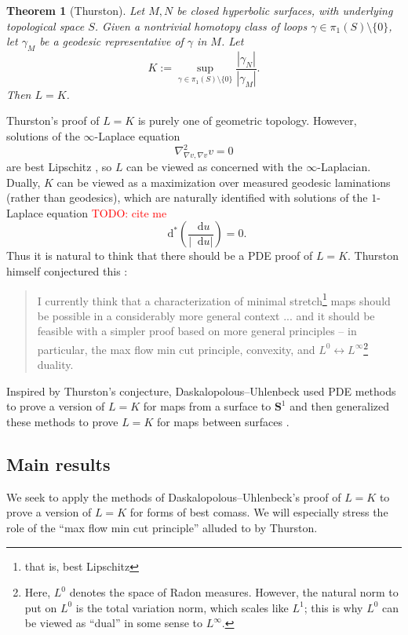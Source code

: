 \documentclass[reqno,11pt]{amsart}
\newcommand{\Sph}{\mathbf S}
\newcommand*\dif{\mathop{}\!\mathrm{d}}
\newtheorem{theorem}{Theorem}[section]
\theoremstyle{definition}
\numberwithin{equation}{section}
\newcommand\todo[1]{\textcolor{red}{TODO: #1}}
\begin{document}
\begin{theorem}[Thurston]
Let $M, N$ be closed hyperbolic surfaces, with underlying topological space $S$.
Given a nontrivial homotopy class of loops $\gamma \in \pi_1(S) \setminus \{0\}$, let $\gamma_M$ be a geodesic representative of $\gamma$ in $M$.
Let
$$K := \sup_{\gamma \in \pi_1(S) \setminus \{0\}} \frac{|\gamma_N|}{|\gamma_M|}.$$
Then $L = K$.
\end{theorem}

Thurston's proof of $L = K$ is purely one of geometric topology.
However, solutions of the $\infty$-Laplace equation 
$$\nabla^2_{\nabla v, \nabla v} v = 0$$
are best Lipschitz \cite{Crandall2008}, so $L$ can be viewed as concerned with the $\infty$-Laplacian.
Dually, $K$ can be viewed as a maximization over measured geodesic laminations (rather than geodesics), which are naturally identified with solutions of the $1$-Laplace equation \todo{cite me}
$$\dif^* \left(\frac{\dif u}{|\dif u|}\right) = 0.$$
Thus it is natural to think that there should be a PDE proof of $L = K$.
Thurston himself conjectured this \cite[Abstract]{Thurston98}:

\begin{quote}
I currently think that a characterization of minimal stretch\footnote{that is, best Lipschitz} maps should be possible in a considerably more general context ... and it should be feasible with a simpler proof based on more general principles -- in particular, the max flow min cut principle, convexity, and $L^0 \leftrightarrow L^\infty$\footnote{Here, $L^0$ denotes the space of Radon measures. However, the natural norm to put on $L^0$ is the total variation norm, which scales like $L^1$; this is why $L^0$ can be viewed as ``dual'' in some sense to $L^\infty$.} duality.
\end{quote}

Inspired by Thurston's conjecture, Daskalopolous--Uhlenbeck used PDE methods to prove a version of $L = K$ for maps from a surface to $\Sph^1$ \cite{daskalopoulos2020transverse} and then generalized these methods to prove $L = K$ for maps between surfaces \cite{daskalopoulos2022,daskalopoulos2023}.


\subsection{Main results}
We seek to apply the methods of Daskalopolous--Uhlenbeck's proof of $L = K$ \cite{daskalopoulos2020transverse, daskalopoulos2022, daskalopoulos2023} to prove a version of $L = K$ for forms of best comass.
We will especially stress the role of the ``max flow min cut principle'' alluded to by Thurston.
\end{document}
